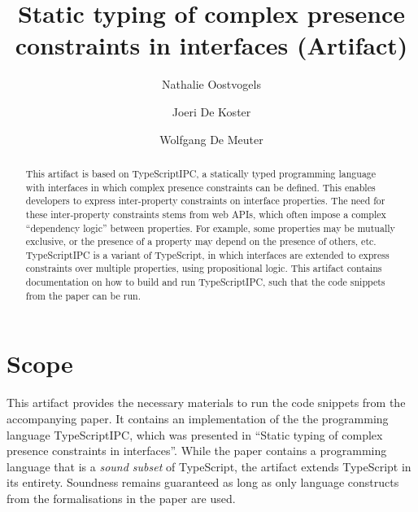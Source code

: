 \documentclass[a4paper,UKenglish]{darts-v2018}
\title{Static typing of complex presence constraints in interfaces (Artifact)}
\author{Nathalie Oostvogels}{Vrije Universiteit Brussel, Brussels, Belgium}{noostvog@vub.ac.be}{}{Funded by a PhD Fellowship of the Research Foundation - Flanders (FWO)}
\author{Joeri De Koster}{Vrije Universiteit Brussel, Brussels, Belgium}{jdekoste@vub.ac.be}{}{}
\author{Wolfgang De Meuter}{Vrije Universiteit Brussel, Brussels, Belgium}{wdmeuter@vub.ac.be}{}{}
\newenvironment{scope}{\section{Scope}}{}
\begin{document}
\maketitle

\begin{abstract}
This artifact is based on TypeScriptIPC, a statically typed programming language with interfaces in which complex presence constraints can be defined.
This enables developers to express inter-property constraints on interface properties.
The need for these inter-property constraints stems from web APIs, which often impose a complex “dependency logic” between properties.
For example, some properties may be mutually exclusive, or the presence of a property may depend on the presence of others, etc.
TypeScriptIPC is a variant of TypeScript, in which interfaces are extended to express constraints over multiple properties, using propositional logic.
This artifact contains documentation on how to build and run TypeScriptIPC, such that the code snippets from the paper can be run.
\end{abstract}


\begin{scope}
This artifact provides the necessary materials to run the code snippets from the accompanying paper.
It contains an implementation of the the programming language TypeScriptIPC, which was presented in ``Static typing of complex presence constraints in interfaces''.
While the paper contains a programming language that is a \emph{sound subset} of TypeScript, the artifact extends TypeScript in its entirety.
Soundness remains guaranteed as long as only language constructs from the formalisations in the paper are used. 
\end{scope}
\end{document}
